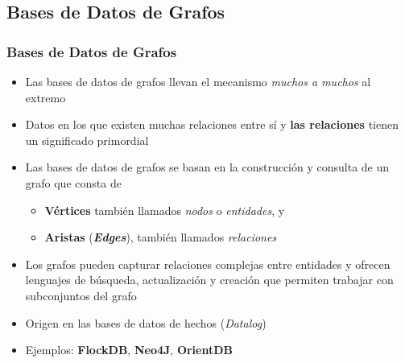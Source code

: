\documentclass[14pt]{beamer}
\begin{document}




\subsection{Bases de Datos de Grafos}

\begin{frame}[allowframebreaks]
  \frametitle{Bases de Datos de Grafos}
\vspace*{-1ex}
  \begin{itemize}
  \item Las bases de datos de grafos llevan el mecanismo {\em muchos a
      muchos} al extremo
  \item Datos en los que existen muchas relaciones entre sí y {\bf las
      relaciones} tienen un significado primordial
\item Las bases de datos de grafos se basan en la construcción y consulta
  de un grafo que consta de
  \begin{itemize}
  \item {\bf Vértices} también llamados {\em nodos} o {\em entidades}, y
  \item {\bf Aristas} ({\bfseries\itshape Edges}), también llamados {\em
      relaciones}
  \end{itemize}
\item Los grafos pueden capturar relaciones complejas entre
  entidades y ofrecen lenguajes de búsqueda, actualización y creación que
  permiten trabajar con subconjuntos del grafo
\item Origen en las bases de datos de hechos ({\em Datalog\/})
\item Ejemplos: {\bf FlockDB}, {\bf Neo4J}, {\bf OrientDB}
\end{itemize}
\end{frame}
\end{document}
